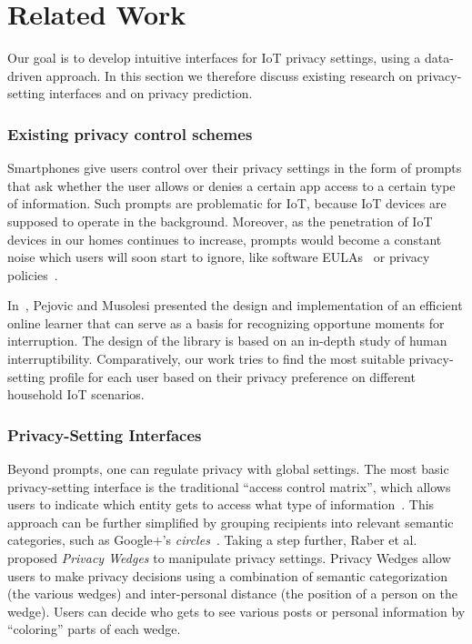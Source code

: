 \chapter{Related Work}

Our goal is to develop intuitive interfaces for IoT privacy settings, using a data-driven approach. In this section we therefore discuss existing research on privacy-setting interfaces and on privacy prediction.

\subsection{Existing privacy control schemes}
Smartphones give users control over their privacy settings in the form of prompts that ask whether the user allows or denies a certain app access to a certain type of information. Such prompts are problematic for IoT, because IoT devices are supposed to operate in the background. Moreover, as the penetration of IoT devices in our homes continues to increase, prompts would become a constant noise which users will soon start to ignore, like software EULAs~\cite{good2005spyware} or privacy policies~\cite{jensen2004privacy}.

In~\cite{Pejovic2014}, Pejovic and Musolesi presented the design and implementation of an efficient online learner that can serve as a basis for recognizing opportune moments for interruption. The design of the library is based on an in-depth study of human interruptibility. Comparatively, our work tries to find the most suitable privacy-setting profile for each user based on their privacy preference on different household IoT scenarios.

\subsection{Privacy-Setting Interfaces}
Beyond prompts, one can regulate privacy with global settings. The most basic privacy-setting interface is the traditional ``access control matrix'', which allows users to indicate which entity gets to access what type of information~\cite{sandhu1994access}. This approach can be further simplified by grouping recipients into relevant semantic categories, such as Google+'s \emph{circles}~\cite{watson12}. Taking a step further, Raber et al.~\cite{197908} proposed \emph{Privacy Wedges} to manipulate privacy settings. Privacy Wedges allow users to make privacy decisions using a combination of semantic categorization (the various wedges) and inter-personal distance (the position of a person on the wedge). Users can decide who gets to see various posts or personal information by ``coloring'' parts of each wedge. 

